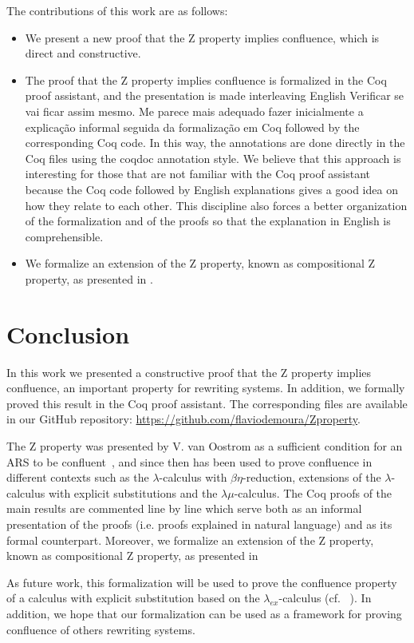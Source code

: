 \documentclass{llncs}
\newcommand{\flavio}[1]{{\color{red}#1}}
\begin{document}
The contributions of this work are as follows:
\begin{itemize}
\item We present a new proof that the Z property implies confluence,
  which is direct and constructive.
\item The proof that the Z property implies confluence is formalized
  in the Coq proof assistant, and the presentation is made
  interleaving English \flavio{Verificar se vai ficar assim mesmo. Me
    parece mais adequado fazer inicialmente a explicação informal
    seguida da formalização em Coq} followed by the corresponding Coq
  code. In this way, the annotations are done directly in the Coq
  files using the coqdoc annotation style. We believe that this
  approach is interesting for those that are not familiar with the Coq
  proof assistant because the Coq code followed by English
  explanations gives a good idea on how they relate to each
  other. This discipline also forces a better organization of the
  formalization and of the proofs so that the explanation in English
  is comprehensible.
\item We formalize an extension of the Z property, known as
  compositional Z property, as presented in
  \cite{Nakazawa-Fujita2016}.
\end{itemize}




\section{Conclusion}

In this work we presented a constructive proof that the Z property
implies confluence, an important property for rewriting systems. In
addition, we formally proved this result in the Coq proof
assistant. The corresponding files are available in our GitHub
repository: \url{https://github.com/flaviodemoura/Zproperty}.

The Z property was presented by V. van Oostrom as a sufficient
condition for an ARS to be confluent~\cite{zproperty}, and since
then has been used to prove confluence in different contexts such as
the $\lambda$-calculus with $\beta\eta$-reduction, extensions of the
$\lambda$-calculus with explicit substitutions and the
$\lambda\mu$-calculus. The Coq proofs of the main results are
commented line by line which serve both as an informal presentation of
the proofs (i.e. proofs explained in natural language) and as its
formal counterpart. Moreover, we formalize an extension of the Z
property, known as compositional Z property, as presented in
\cite{Nakazawa-Fujita2016}

As future work, this formalization will be used to prove the
confluence property of a calculus with explicit substitution based on
the $\lambda_{ex}$-calculus (cf. ~\cite{kes09}). In addition, we hope
that our formalization can be used as a framework for proving
confluence of others rewriting systems.



\end{document}
